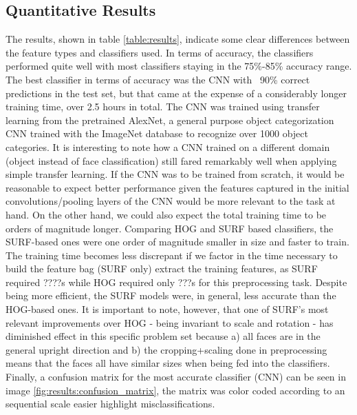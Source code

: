 \documentclass[11pt]{article}
\begin{document}
    \subsection{Quantitative Results}
        The results, shown in table \ref{table:results}, indicate some clear differences between the feature types and classifiers used. In terms of accuracy, the classifiers performed quite well with most classifiers staying in the 75\%-85\% accuracy range. The best classifier in terms of accuracy was the CNN with ~90\% correct predictions in the test set, but that came at the expense of a considerably longer training time, over 2.5 hours in total.
        The CNN was trained using transfer learning from the pretrained AlexNet, a general purpose object categorization CNN trained with the ImageNet database to recognize over 1000 object categories. It is interesting to note how a CNN trained on a different domain (object instead of face classification) still fared remarkably well when applying simple transfer learning. If the CNN was to be trained from scratch, it would be reasonable to expect better performance given the features captured in the initial convolutions/pooling layers of the CNN would be more relevant to the task at hand. On the other hand, we could also expect the total training time to be orders of magnitude longer.
        Comparing HOG and SURF based classifiers, the SURF-based ones were one order of magnitude smaller in size and faster to train. The training time becomes less discrepant if we factor in the time necessary to build the feature bag (SURF only) extract the training features, as SURF required ????s while HOG required only ???s for this preprocessing task. Despite being more efficient, the SURF models were, in general, less accurate than the HOG-based ones. It is important to note, however, that one of SURF's most relevant improvements over HOG - being invariant to scale and rotation - has diminished effect in this specific problem set because a) all faces are in the general upright direction and b) the cropping+scaling done in preprocessing means that the faces all have similar sizes when being fed into the classifiers.
        Finally, a confusion matrix for the most accurate classifier (CNN) can be seen in image \ref{fig:results:confusion_matrix}, the matrix was color coded according to an sequential scale easier highlight misclassifications.
\end{document}
